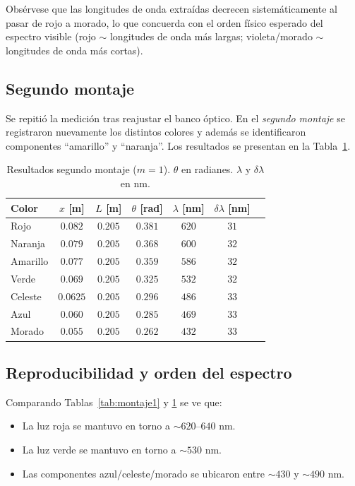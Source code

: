 \documentclass[11pt,twocolumn]{article}
\begin{document}
Obsérvese que las longitudes de onda extraídas decrecen sistemáticamente al pasar de rojo a morado, lo que concuerda con el orden físico esperado del espectro visible (rojo $\sim$ longitudes de onda más largas; violeta/morado $\sim$ longitudes de onda más cortas).

\subsection{Segundo montaje}
Se repitió la medición tras reajustar el banco óptico. En el \textit{segundo montaje} se registraron nuevamente los distintos colores y además se identificaron componentes ``amarillo'' y ``naranja''. Los resultados se presentan en la Tabla~\ref{tab:montaje2}.

\begin{table}
    \centering
    \caption{Resultados segundo montaje ($m=1$). $\theta$ en radianes. $\lambda$ y $\delta\lambda$ en nm.}
    \label{tab:montaje2}
    \begin{tabular}{lcccccc}
        \toprule
        Color &
        $x$ [m] &
        $L$ [m] &
        $\theta$ [rad] &
        $\lambda$ [nm] &
        $\delta\lambda$ [nm] \\
        \midrule
        Rojo     & $0.082$  & $0.205$ & $0.381$ & $620$ & $31$ \\
        Naranja  & $0.079$  & $0.205$ & $0.368$ & $600$ & $32$ \\
        Amarillo & $0.077$  & $0.205$ & $0.359$ & $586$ & $32$ \\
        Verde    & $0.069$  & $0.205$ & $0.325$ & $532$ & $32$ \\
        Celeste  & $0.0625$ & $0.205$ & $0.296$ & $486$ & $33$ \\
        Azul     & $0.060$  & $0.205$ & $0.285$ & $469$ & $33$ \\
        Morado   & $0.055$  & $0.205$ & $0.262$ & $432$ & $33$ \\
        \bottomrule
    \end{tabular}
\end{table}

\subsection{Reproducibilidad y orden del espectro}
Comparando Tablas~\ref{tab:montaje1} y \ref{tab:montaje2} se ve que:
\begin{itemize}
    \item La luz roja se mantuvo en torno a $\sim 620\text{--}640$ nm.
    \item La luz verde se mantuvo en torno a $\sim 530$ nm.
    \item Las componentes azul/celeste/morado se ubicaron entre $\sim 430$ y $\sim 490$ nm.
\end{itemize}
\end{document}
